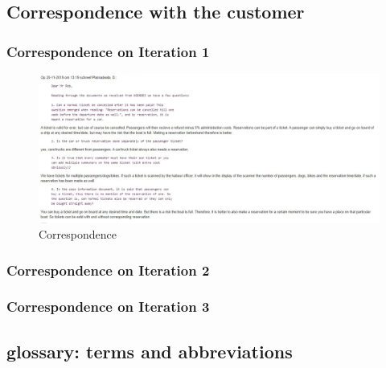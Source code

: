 







\subsection{Correspondence with the customer}
\begin{small}
% 
\end{small}

\subsubsection{Correspondence on Iteration 1}
\begin{small}
%
\begin{figure}[H]
    \centering
    \includegraphics[scale=0.4]{Iteration_2/Files/Iteration1Email.jpeg}
    \caption{Correspondence}
    \label{fig:my_label}
\end{figure}
\end{small}

\subsubsection{Correspondence on Iteration 2}
\begin{small}
% 
\end{small}

\subsubsection{Correspondence on Iteration 3}
% 

\subsection{glossary: terms and abbreviations}